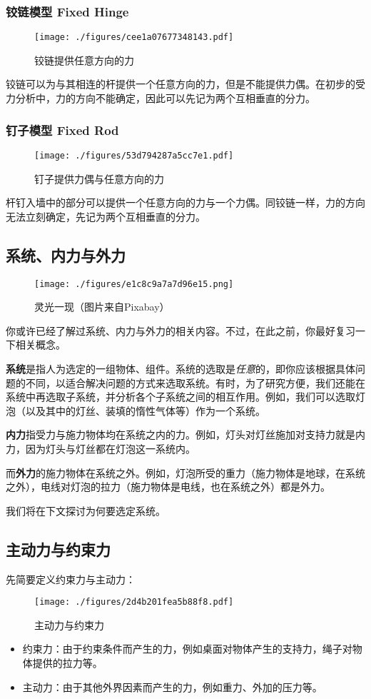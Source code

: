 \subsubsection{铰链模型 Fixed Hinge}
\begin{figure}[ht]
\centering
\texttt{[image: ./figures/cee1a07677348143.pdf]}
\caption{铰链提供任意方向的力} \label{fig_RGDFA_6}
\end{figure}
铰链可以为与其相连的杆提供一个任意方向的力，但是不能提供力偶。在初步的受力分析中，力的方向不能确定，因此可以先记为两个互相垂直的分力。
\subsubsection{钉子模型 Fixed Rod}
\begin{figure}[ht]
\centering
\texttt{[image: ./figures/53d794287a5cc7e1.pdf]}
\caption{钉子提供力偶与任意方向的力} \label{fig_RGDFA_7}
\end{figure}
杆钉入墙中的部分可以提供一个任意方向的力与一个力偶。同铰链一样，力的方向无法立刻确定，先记为两个互相垂直的分力。

\subsection{系统、内力与外力}
\begin{figure}[ht]
\centering
\texttt{[image: ./figures/e1c8c9a7a7d96e15.png]}
\caption{灵光一现（图片来自Pixabay）} \label{fig_RGDFA_15}
\end{figure}

你或许已经了解过系统、内力与外力的相关内容。不过，在此之前，你最好复习一下相关概念。

\textbf{系统}是指人为选定的一组物体、组件。系统的选取是\textsl{任意}的，即你应该根据具体问题的不同，以适合解决问题的方式来选取系统。有时，为了研究方便，我们还能在系统中再选取子系统，并分析各个子系统之间的相互作用。例如，我们可以选取灯泡（以及其中的灯丝、装填的惰性气体等）作为一个系统。

\textbf{内力}指受力与施力物体均在系统之内的力。例如，灯头对灯丝施加对支持力就是内力，因为灯头与灯丝都在灯泡这一系统内。

而\textbf{外力}的施力物体在系统之外。例如，灯泡所受的重力（施力物体是地球，在系统之外），电线对灯泡的拉力（施力物体是电线，也在系统之外）都是外力。

我们将在下文探讨为何要选定系统。

\subsection{主动力与约束力}
先简要定义约束力与主动力：
\begin{figure}[ht]
\centering
\texttt{[image: ./figures/2d4b201fea5b88f8.pdf]}
\caption{主动力与约束力} \label{fig_RGDFA_8}
\end{figure}
\begin{itemize}
\item 约束力：由于约束条件而产生的力，例如桌面对物体产生的支持力，绳子对物体提供的拉力等。
\item 主动力：由于其他外界因素而产生的力，例如重力、外加的压力等。
\end{itemize}

